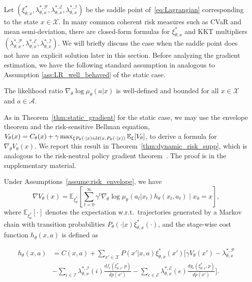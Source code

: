Let $(\xi^*_{\theta,x},\lambda^{*,\mathcal P}_{\theta,x},\lambda^{*,\mathcal E}_{\theta,x},\lambda^{*,\mathcal I}_{\theta,x})$ be the saddle point of~\eqref{eq:Lagrangian} corresponding to the state $x\in\mathcal X$. In many common coherent risk measures such as CVaR and mean semi-deviation, there are closed-form formulas for $\xi^*_{\theta,x}$ and KKT multipliers $(\lambda^{*,\mathcal P}_{\theta,x},\lambda^{*,\mathcal E}_{\theta,x},\lambda^{*,\mathcal I}_{\theta,x})$. We will briefly discuss the case when the saddle point does not have an explicit solution later in this section. Before analyzing the gradient estimation, we have the following standard assumption in analogous to Assumption \ref{ass:LR_well_behaved} of the static case.
\begin{assumption}
The likelihood ratio $\nabla_\theta\log\mu_\theta(a|x)$ is well-defined and bounded for all $x\in\mathcal X$ and $a\in\mathcal A$.
\end{assumption}

As in Theorem~\ref{thm:static_gradient} for the static case, we may use the envelope theorem and the risk-sensitive Bellman equation, $V_\theta(x)=C_\theta(x) + \gamma\max_{\xi P_\theta(\cdot |x)\in {\mathcal{U}}(x,P_\theta(\cdot |x))}\mathbb E_{\xi}[V_\theta]$, to derive a formula for $\nabla_\theta V_\theta(x)$. We report this result in Theorem~\ref{thm:dynamic_risk_supp}, which is analogous to the risk-neutral policy gradient theorem~\cite{sutton_policy_2000,konda2000actor,bhatnagar_natural_2009}. The proof is in the supplementary material.
%
\begin{theorem}\label{thm:dynamic_risk_supp}
Under Assumptions~\ref{assume:risk_envelope}, we have
%
\begin{equation*}
\nabla V_\theta(x) \!=\! \mathbb E_{\xi^*_\theta} \! \! \left[\sum_{t=0}^{\infty}\gamma^t\nabla_\theta\log\mu_\theta(\!a_t|x_t\!)h_\theta(\!x_t,\!a_t\!)\!\mid\! x_0\!\!=\!\!x\right],
\end{equation*}
%
where $\mathbb E_{\xi^*_\theta}[\cdot]$ denotes the expectation w.r.t.~trajectories generated by a Markov chain with transition probabilities $P_\theta(\cdot|x)\xi_{\theta,x}^*(\cdot)$, and the stage-wise cost function $h_\theta(x,a)$ is defined as

\vspace{-0.2in}
\begin{small}
\begin{align}
h_\theta(x,a) &= C(x,a) + \sum_{x'  \in \mathcal X} P(x'|x,a)\xi^*_{\theta,x}(x')\Big[\gamma V_\theta(x')-\!{\lambda}^{*,\mathcal P}_{\theta,x} \nonumber \\
&-\sum_{i\in\mathcal I} {\lambda}^{*,\mathcal I}_{\theta,x}(i)\frac{ d f_i(\xi^*_{\theta,x},p)}{d p(x')} - \sum_{e\in\mathcal E}\!{\lambda}^{*,\mathcal E}_{\theta,x}(e) \frac{ d g_e(\xi^*_{\theta,x},p)}{d p(x')}\Big].
\label{eq:h}
\end{align}
\end{small}
\vspace{-0.2in}
\end{theorem}

